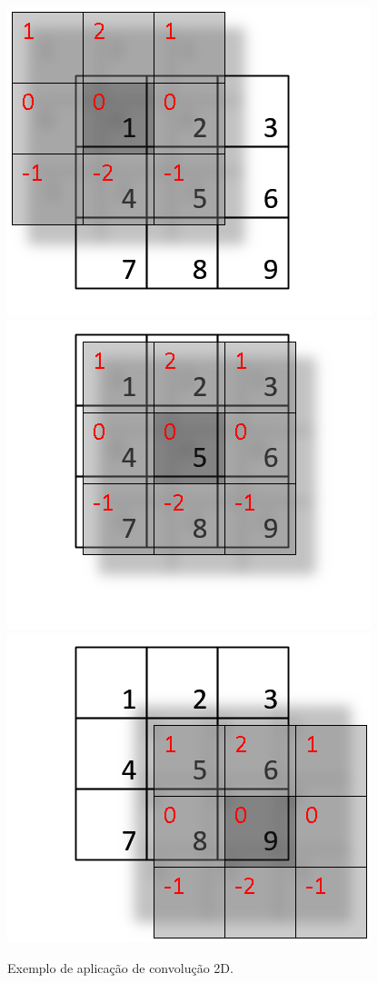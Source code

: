 \documentclass[twoside,twocolumn]{article}
\begin{document}
\begin{figure}[H]
\begin{center}
	\includegraphics[scale=.2]{figures/mult1.png}
	\includegraphics[scale=.2]{figures/multi5.png}
	\includegraphics[scale=.2]{figures/mult9.png}
\caption{Exemplo de aplicação de convolução 2D.} \label{gdimotes}
\end{center}
\end{figure}
\end{document}
